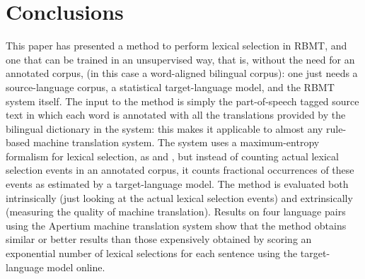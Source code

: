 \documentclass[11pt]{article}
\newcommand{\comment}[1]{\todo{#1}}
\begin{document}
\section{Conclusions}

This paper has presented a method to perform lexical selection in
RBMT, and one that can be trained in an unsupervised way, that is,
without the need for an annotated corpus, (in this case a word-aligned
bilingual corpus): one just needs a source-language corpus, a
statistical target-language model, and the RBMT system itself. The
input to the method is simply the part-of-speech tagged source text in
which each word is annotated with all the translations provided by the
bilingual dictionary in the system: this makes it applicable to almost
any rule-based machine translation system. The system uses a
maximum-entropy formalism for lexical selection, as \cite{berger1996}
and \cite{marechek10}, but instead of counting actual lexical
selection events in an annotated corpus, it counts fractional
occurrences of these events as estimated by a target-language
model. The method is evaluated both intrinsically (just looking at the
actual lexical selection events) and extrinsically (measuring the
quality of machine translation). Results on four language pairs using
the Apertium \citep{forcada2011apertium} machine translation system
show that the method obtains similar or better results than those
expensively obtained by scoring an exponential number of lexical
selections for each sentence using the target-language model online.

\end{document}
